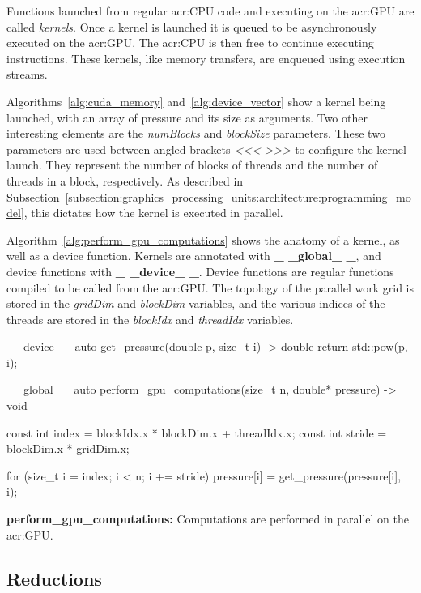 Functions launched from regular \acrshort{acr:CPU} code and executing on the \acrshort{acr:GPU} are
called \textit{kernels}. Once a kernel is launched it is queued to be asynchronously executed on the
\acrshort{acr:GPU}. The \acrshort{acr:CPU} is then free to continue executing instructions. These
kernels, like memory transfers, are enqueued using execution streams.

Algorithms~\ref{alg:cuda_memory} and~\ref{alg:device_vector} show a kernel being launched, with an
array of pressure and its size as arguments. Two other interesting elements are the
\textit{numBlocks} and \textit{blockSize} parameters. These two parameters are used between angled
brackets \textit{<<< >>>} to configure the kernel launch. They represent the number of blocks of
threads and the number of threads in a block, respectively. As described in
Subsection~\ref{subsection:graphics_processing_units:architecture:programming_model}, this dictates
how the kernel is executed in parallel.

Algorithm~\ref{alg:perform_gpu_computations} shows the anatomy of a kernel, as well as a device
function. Kernels are annotated with \textbf{\_ \_global\_ \_}, and device functions with
\textbf{\_ \_device\_ \_}. Device functions are regular functions compiled to be called from the
\acrshort{acr:GPU}. The topology of the parallel work grid is stored in the \textit{gridDim} and
\textit{blockDim} variables, and the various indices of the threads are stored in the
\textit{blockIdx} and \textit{threadIdx} variables.

\begin{algorithm}[H]
    \begin{cuda}
		__device__ 
		auto get_pressure(double p, size_t i) -> double {
			return std::pow(p, i);
		}

		__global__
		auto perform_gpu_computations(size_t n, double* pressure) -> void {
			const int index = blockIdx.x * blockDim.x + threadIdx.x;
			const int stride = blockDim.x * gridDim.x;

			for (size_t i = index; i < n; i += stride) {
				pressure[i] = get_pressure(pressure[i], i);
			}
		}\end{cuda}
\caption{\textbf{perform\_gpu\_computations:} Computations are performed in parallel on the \acrshort{acr:GPU}.}\label{alg:perform_gpu_computations}
\end{algorithm}

\subsection{Reductions}\label{subsection:graphics_processing_units:implementation:reductions}

